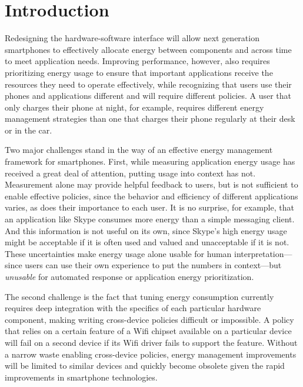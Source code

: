 \section{Introduction}


Redesigning the hardware-software interface will allow next generation
smartphones to effectively allocate energy between components and across time
to meet application needs. Improving performance, however, also requires
prioritizing energy usage to ensure that important applications receive the
resources they need to operate effectively, while recognizing that users use
their phones and applications different and will require different policies.
A user that only charges their phone at night, for example, requires
different energy management strategies than one that charges their phone
regularly at their desk or in the car.

Two major challenges stand in the way of an effective energy management
framework for smartphones. First, while measuring application energy usage
has received a great deal of attention, putting usage into context has not.
Measurement alone may provide helpful feedback to users, but is not
sufficient to enable effective policies, since the behavior and efficiency of
different applications varies, as does their importance to each user. It is
no surprise, for example, that an application like Skype consumes more energy
than a simple messaging client. And this information is not useful on its
own, since Skype's high energy usage might be acceptable if it is often used
and valued and unacceptable if it is not. These uncertainties make energy
usage alone usable for human interpretation---since users can use their own
experience to put the numbers in context---but \textit{unusable} for
automated response or application energy prioritization.

The second challenge is the fact that tuning energy consumption currently
requires deep integration with the specifics of each particular hardware
component, making writing cross-device policies difficult or impossible. A
policy that relies on a certain feature of a Wifi chipset available on a
particular device will fail on a second device if its Wifi driver fails to
support the feature. Without a narrow waste enabling cross-device policies,
energy management improvements will be limited to similar devices and quickly
become obsolete given the rapid improvements in smartphone technologies.

